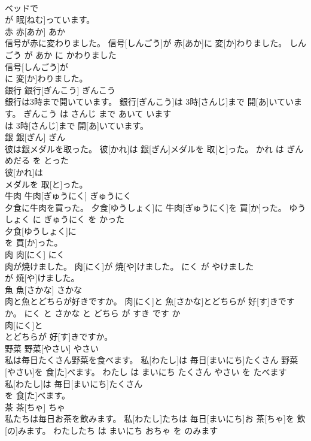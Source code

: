 \documentclass[8pt]{extreport}
\begin{document}
\begin{CJK}{UTF8}{min}
\\	ベッドで
\\	が 眠[ねむ]っています。			
\\	赤	赤[あか]	あか	
\\	信号が赤に変わりました。	信号[しんごう]が 赤[あか]に 変[か]わりました。	しんごう が あか に かわりました	
\\	信号[しんごう]が
\\	に 変[か]わりました。			
\\	銀行	銀行[ぎんこう]	ぎんこう	
\\	銀行は3時まで開いています。	銀行[ぎんこう]は 3時[さんじ]まで 開[あ]いています。	ぎんこう は さんじ まで あいて います	
\\	は 3時[さんじ]まで 開[あ]いています。			
\\	銀	銀[ぎん]	ぎん	
\\	彼は銀メダルを取った。	彼[かれ]は 銀[ぎん]メダルを 取[と]った。	かれ は ぎんめだる を とった	
\\	彼[かれ]は
\\	メダルを 取[と]った。			
\\	牛肉	牛肉[ぎゅうにく]	ぎゅうにく	
\\	夕食に牛肉を買った。	夕食[ゆうしょく]に 牛肉[ぎゅうにく]を 買[か]った。	ゆうしょく に ぎゅうにく を かった	
\\	夕食[ゆうしょく]に
\\	を 買[か]った。			
\\	肉	肉[にく]	にく	
\\	肉が焼けました。	肉[にく]が 焼[や]けました。	にく が やけました	
\\	が 焼[や]けました。			
\\	魚	魚[さかな]	さかな	
\\	肉と魚とどちらが好きですか。	肉[にく]と 魚[さかな]とどちらが 好[す]きですか。	にく と さかな と どちら が すき です か	
\\	肉[にく]と
\\	とどちらが 好[す]きですか。			
\\	野菜	野菜[やさい]	やさい	
\\	私は毎日たくさん野菜を食べます。	私[わたし]は 毎日[まいにち]たくさん 野菜[やさい]を 食[た]べます。	わたし は まいにち たくさん やさい を たべます	
\\	私[わたし]は 毎日[まいにち]たくさん
\\	を 食[た]べます。			
\\	茶	茶[ちゃ]	ちゃ	
\\	私たちは毎日お茶を飲みます。	私[わたし]たちは 毎日[まいにち]お 茶[ちゃ]を 飲[の]みます。	わたしたち は まいにち おちゃ を のみます	

\end{CJK}
\end{document}
